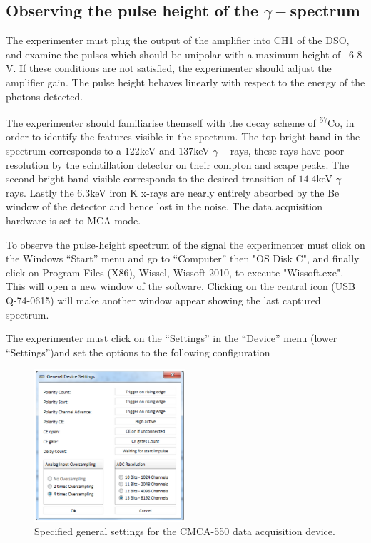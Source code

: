 \documentclass[a4paper, twocolumn]{article}
\begin{document}
\subsection{Observing the pulse height of the $\gamma-$spectrum}
The experimenter must plug the output of the amplifier into CH1 of the DSO, and examine the pulses which should be unipolar with a maximum height of ~6-8 V\cite{0}. If these conditions are not satisfied, the experimenter should adjust the amplifier gain. The pulse height behaves linearly with respect to the energy of the photons detected\cite{0}. 

The experimenter should familiarise themself with the decay scheme of \textsuperscript{57}Co, in order to identify the features visible in the spectrum. The top bright band in the spectrum corresponds to a $122$keV and $137$keV $\gamma-$rays, these rays have poor resolution by the scintillation detector on their compton and scape peaks. The second bright band visible corresponds to the desired transition of $14.4$keV $\gamma-$rays. Lastly the $6.3$keV iron K x-rays are nearly entirely absorbed by the Be window of the detector and hence lost in the noise\cite{0}. The data acquisition hardware is set to MCA mode.

To observe the pulse-height spectrum of the signal the experimenter must click on the Windows “Start” menu and go to “Computer” then "OS Disk C", and finally click on Program Files (X86), Wissel, Wissoft 2010, to execute "Wissoft.exe". This will open a new window of the software.
Clicking on the central icon (USB Q-74-0615) will make another window appear showing the last captured spectrum\cite{0}. 

The experimenter must click on the “Settings” in the “Device” menu (lower “Settings”)and set the options to the following configuration

\begin{figure}
\includegraphics[width=0.5\textwidth]{general_device_settings.png}    
\caption{Specified general settings for the CMCA-550 data acquisition device\cite{0}.
}
\end{figure}
\end{document}
